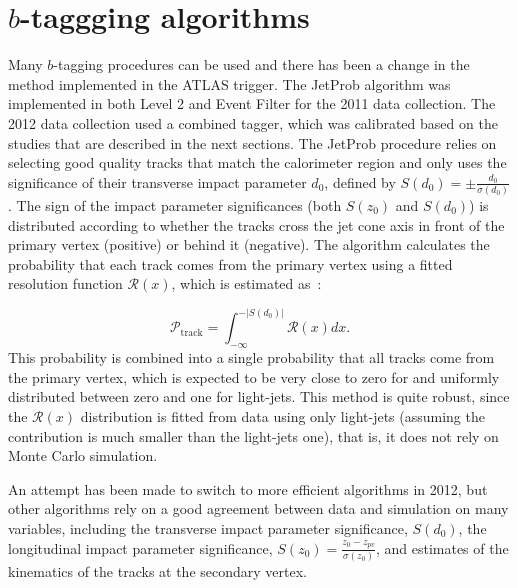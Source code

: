 \section{$b$-taggging algorithms}

Many $b$-tagging procedures can be used and there has been a change in the method implemented in the ATLAS \bjet trigger. The JetProb algorithm was implemented in
both Level 2 and Event Filter
for the 2011 data collection. The 2012 data collection used a combined tagger, which was calibrated based on the studies that are described in the next sections.
The JetProb procedure relies on selecting good quality tracks that match the calorimeter region and only uses the significance of their transverse impact parameter $d_0$,
defined by $S(d_0) = \pm \frac{d_0}{\sigma(d_0)}$. The sign of the impact parameter significances (both $S(z_0)$ and $S(d_0)$)
is distributed according to whether the tracks cross the jet cone axis in front of the primary vertex (positive) or behind it (negative).
The algorithm calculates the probability that each track comes from the primary vertex using a fitted resolution function
$\mathcal{R}(x)$, which is estimated as~\cite{bjet_proc_pelle}:

\begin{equation}
\displaystyle
\mathcal{P}_{\mathrm{track}} = \int_{-\infty}^{-|S(d_0)|} \mathcal{R}(x) dx.
\label{eq:jetprob}
\end{equation}
This probability is combined into a single probability that all tracks come from the primary vertex, which is expected to be very close to zero for
\bjets and uniformly distributed between zero and one for light-jets.
%
This method is quite robust, since the $\mathcal{R}(x)$ distribution is
fitted from data using only light-jets (assuming the \bjet contribution is much smaller than the light-jets one), that is, it does not rely on Monte Carlo simulation.

An attempt has been made to switch to more efficient algorithms in 2012, but other algorithms rely on a good agreement between data and simulation
on many variables, including the transverse impact parameter significance, $S(d_0)$, the longitudinal impact parameter significance,
$S(z_0) = \frac{z_0 - z_{pv}}{\sigma(z_0)}$, and estimates of the kinematics of the tracks at the secondary vertex.

